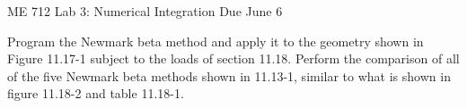 \documentclass[11pt]{article}
\begin{document}
\begin{center}
	\LARGE{ME 712 Lab 3: Numerical Integration}
	Due June 6
\end{center}
\vspace{.3in}

\noindent Program the Newmark beta method and apply it to the geometry shown in Figure 11.17-1 subject to the loads of section 11.18. Perform the comparison of all of the five Newmark beta methods shown in 11.13-1, similar to what is shown in figure 11.18-2 and table 11.18-1. 
\end{document}
